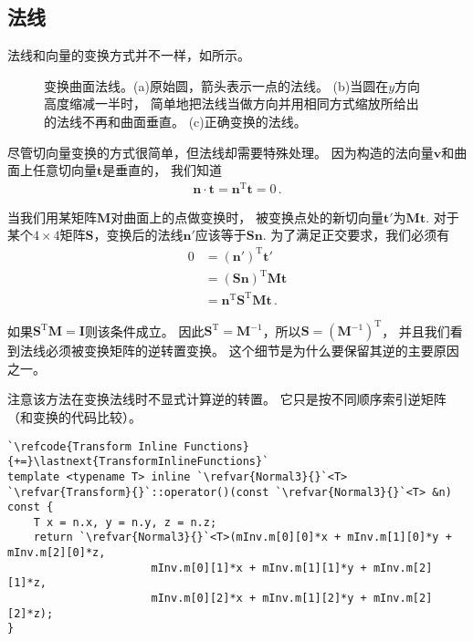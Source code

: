 \subsection{法线}\label{sub:法线}
法线和向量的变换方式并不一样，如所示。
\begin{figure}[htbp]
    \centering
    \caption{变换曲面法线。(a)原始圆，箭头表示一点的法线。
        (b)当圆在$y$方向高度缩减一半时，
        简单地把法线当做方向并用相同方式缩放所给出的法线不再和曲面垂直。
        (c)正确变换的法线。}
    \label{fig:2.14}
\end{figure}

尽管切向量变换的方式很简单，但法线却需要特殊处理。
因为构造的法向量$\bm v$和曲面上任意切向量$\bm t$是垂直的，
我们知道
\begin{align*}
    \bm n\cdot\bm t=\bm n^\mathrm{T}\bm t=0\, .
\end{align*}

当我们用某矩阵$\bm M$对曲面上的点做变换时，
被变换点处的新切向量$\bm t'$为$\bm M\bm t$.
对于某个$4\times4$矩阵$\bm S$，变换后的法线$\bm n'$应该等于$\bm S\bm n$.
为了满足正交要求，我们必须有
\begin{align*}
    0 & =(\bm n')^\mathrm{T}\bm t'                      \\
      & =(\bm S\bm n)^\mathrm{T}\bm M\bm t              \\
      & =\bm n^\mathrm{T}\bm S^\mathrm{T}\bm M\bm t\, .
\end{align*}

如果$\bm S^\mathrm{T}\bm M=\bm I$则该条件成立。
因此$\bm S^\mathrm{T}=\bm M^{-1}$，所以$\bm S=(\bm M^{-1})^\mathrm{T}$，
并且我们看到法线必须被变换矩阵的逆转置变换。
这个细节是为什么要保留其逆的主要原因之一。

注意该方法在变换法线时不显式计算逆的转置。
它只是按不同顺序索引逆矩阵（和变换的代码比较）。
\begin{lstlisting}
`\refcode{Transform Inline Functions}{+=}\lastnext{TransformInlineFunctions}`
template <typename T> inline `\refvar{Normal3}{}`<T>
`\refvar{Transform}{}`::operator()(const `\refvar{Normal3}{}`<T> &n) const {
    T x = n.x, y = n.y, z = n.z;
    return `\refvar{Normal3}{}`<T>(mInv.m[0][0]*x + mInv.m[1][0]*y + mInv.m[2][0]*z,
                      mInv.m[0][1]*x + mInv.m[1][1]*y + mInv.m[2][1]*z,
                      mInv.m[0][2]*x + mInv.m[1][2]*y + mInv.m[2][2]*z);
}
\end{lstlisting}

